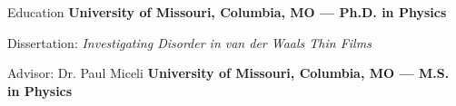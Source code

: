\begin{rubric}{Education}
    \textbf{University of Missouri, Columbia, MO --- Ph.D. in Physics}
    \par Dissertation: \emph{Investigating Disorder in van der Waals Thin Films}
    \par Advisor: Dr. Paul Miceli
  \entry*[May 2022]%
    \textbf{University of Missouri, Columbia, MO --- M.S. in Physics}

\end{rubric}
